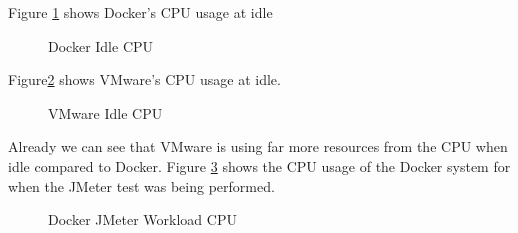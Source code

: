 Figure \ref{fig:DockerCPUIdle} shows Docker's CPU usage at idle
\begin{figure}[H]
\caption{Docker Idle CPU}
\label{fig:DockerCPUIdle}
\centering
\end{figure}


Figure\ref{fig:VMwareCPUIdle} shows VMware's CPU usage at idle.
\begin{figure}[H]
\caption{VMware Idle CPU}
\label{fig:VMwareCPUIdle}
\centering
\end{figure}

Already we can see that VMware is using far more resources from the CPU when idle compared to Docker.
Figure \ref{fig:DockerCPUwork} shows the CPU usage of the Docker system for when the JMeter test was being performed.
\begin{figure}[H]
\caption{Docker JMeter Workload CPU}
\label{fig:DockerCPUwork}
\centering
\end{figure}

